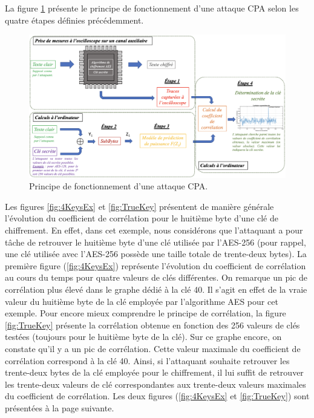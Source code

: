 \documentclass[oneside]{book}
\begin{document}
\hspace{-0.5 cm}La figure \ref{fig:CPA_attacks} présente le principe de fonctionnement d'une attaque CPA selon les quatre étapes définies précédemment. 
\begin{figure}[htbp]
    \hspace{-1.3cm}
    \includegraphics[scale=0.60]{image/CPA_attacks}
    \caption{Principe de fonctionnement d'une attaque CPA.}
    \label{fig:CPA_attacks}
\end{figure}

 \vspace{1cm}\hspace{-0.5 cm}Les figures \ref{fig:4KeysEx} et \ref{fig:TrueKey} présentent de manière générale l'évolution du coefficient de corrélation pour le huitième byte d'une clé de chiffrement. En effet, dans cet exemple, nous considérons que l'attaquant a pour tâche de retrouver le huitième byte d'une clé utilisée par l'AES-256 (pour rappel, une clé utilisée avec l'AES-256 possède une taille totale de trente-deux bytes). La première figure (\ref{fig:4KeysEx}) représente l'évolution du coefficient de corrélation au cours du temps pour quatre valeurs de clés différentes. On remarque un pic de corrélation plus élevé dans le graphe dédié à la clé 40. Il s'agit en effet de la vraie valeur du huitième byte de la clé employée par l'algorithme AES pour cet exemple. Pour encore mieux comprendre le principe de corrélation, la figure \ref{fig:TrueKey} présente la corrélation obtenue en fonction des 256 valeurs de clés testées (toujours pour le huitième byte de la clé). Sur ce graphe encore, on constate qu'il y a un pic de corrélation. Cette valeur maximale du coefficient de corrélation correspond à la clé 40. Ainsi, si l'attaquant souhaite retrouver les trente-deux bytes de la clé employée pour le chiffrement, il lui suffit de retrouver les trente-deux valeurs de clé correspondantes aux trente-deux valeurs maximales du coefficient de corrélation. Les deux figures (\ref{fig:4KeysEx} et \ref{fig:TrueKey}) sont présentées à la page suivante.
\end{document}
